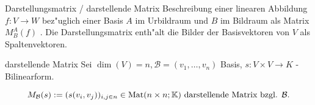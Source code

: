 \documentclass[class=article, crop=false]{standalone}
\begin{document}
\begin{zettel}{Darstellungsmatrix / darstellende Matrix}
Beschreibung einer linearen Abbildung  $f: V \longrightarrow W$ bez"uglich einer Basis $A$ im Urbildraum und $B$ im Bildraum als Matrix $M^{A}_{B} (f)$ .
Die Darstellungsmatrix enth"alt die Bilder der Basisvektoren von $V$ als Spaltenvektoren.

\begin{flashcard}{darstellende Matrix}
	Sei $\dim(V)= n, \mathcal B = ( v_1,\dots,v_n)$ Basis, $s: V \times V \to  K$ - Bilinearform.
	\begin{definition}
		\[
			M_{\mathcal B}(s) := ( s (v_i, v_j))_{i,j \in n } \in  \operatorname{Mat}(n \times n; \mathbb{K}) \text{ darstellende Matrix bzgl. } \mathcal B
		.\]

	\end{definition}
\end{flashcard}
\end{zettel}
\end{document}
